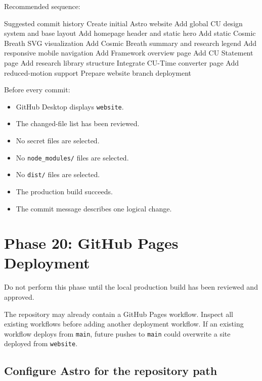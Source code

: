 \documentclass[11pt,letterpaper]{article}
\newcommand{\checkbox}{\(\square\)}
\newcommand{\filepath}[1]{\texttt{#1}}
\newcommand{\branchname}[1]{\texttt{#1}}
\begin{document}
Recommended sequence:

\begin{codebox}{Suggested commit history}
Create initial Astro website
Add global CU design system and base layout
Add homepage header and static hero
Add static Cosmic Breath SVG visualization
Add Cosmic Breath summary and research legend
Add responsive mobile navigation
Add Framework overview page
Add CU Statement page
Add research library structure
Integrate CU-Time converter page
Add reduced-motion support
Prepare website branch deployment
\end{codebox}

Before every commit:

\begin{itemize}
    \item[\checkbox] GitHub Desktop displays \branchname{website}.
    \item[\checkbox] The changed-file list has been reviewed.
    \item[\checkbox] No secret files are selected.
    \item[\checkbox] No \filepath{node\_modules/} files are selected.
    \item[\checkbox] No \filepath{dist/} files are selected.
    \item[\checkbox] The production build succeeds.
    \item[\checkbox] The commit message describes one logical change.
\end{itemize}

\section{Phase 20: GitHub Pages Deployment}

\begin{warningbox}
Do not perform this phase until the local production build has been
reviewed and approved.

The repository may already contain a GitHub Pages workflow. Inspect
all existing workflows before adding another deployment workflow.
If an existing workflow deploys from \branchname{main}, future pushes
to \branchname{main} could overwrite a site deployed from
\branchname{website}.
\end{warningbox}

\subsection{Configure Astro for the repository path}
\end{document}
